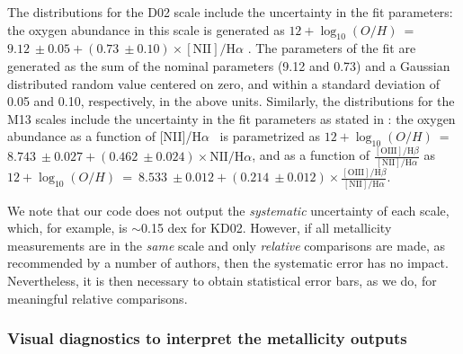 \documentclass{emulateapj}
\newcommand{\oxabinline}{\ensuremath{12 + \log_{10}(O/H)}}
\newcommand{\ha}{\ensuremath{\mathrm{H}\alpha}}
\begin{document}
The distributions for the D02 scale include the uncertainty in the fit parameters: the oxygen abundance in this scale is generated as \oxabinline~=~$9.12~\pm 0.05 + (0.73~\pm 0.10)\times\mathrm{[NII]}/\mathrm{H}\alpha$ \citep{denicolo02}. The parameters of the fit are generated as the sum of the nominal parameters (9.12 and 0.73) and a Gaussian distributed random value centered on zero, and within a standard deviation of 0.05 and 0.10, respectively, in the above units.
Similarly, the distributions for the M13 scales include the uncertainty in the fit parameters as stated in \citet{marino13}: the oxygen abundance as a function of [NII]/\ha~ is parametrized as \oxabinline~=~$8.743~\pm 0.027 + (0.462~\pm 0.024)\times\mathrm{NII}/\mathrm{H}\alpha$, and as a function of $\frac{\mathrm{[OIII]/H}\beta} {\mathrm{[NII]/H}\alpha}$ as \oxabinline~=~$8.533~\pm 0.012 + (0.214~\pm 0.012)\times\frac{\mathrm{[OIII]/H}\beta} {\mathrm{[NII]/H}\alpha}$.

We note that our code does not output the \emph{systematic} uncertainty of each scale, which, for example, is $\sim$0.15 \nolinebreak dex  for KD02. However, if all metallicity measurements are in the \emph{same} scale and only \emph{relative} comparisons are made, as recommended by a number of authors, then the systematic error has no impact. Nevertheless, it is then necessary to obtain statistical error bars, as we do, for meaningful relative comparisons.




\subsubsection{Visual diagnostics to interpret the metallicity outputs}\label{vizs}
\end{document}

